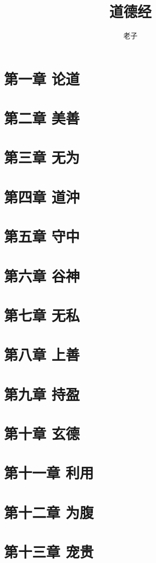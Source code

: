\documentclass[UTF8]{ctexbook}
\title{道德经}
\author{老子}
\date{}
\begin{document}
	\maketitle

	\tableofcontents
	
	\section{第一章 论道}
	\section{第二章 美善}
	\section{第三章 无为}
	\section{第四章 道沖}
	\section{第五章 守中}
	\section{第六章 谷神}
	\section{第七章 无私}
	\section{第八章 上善}
	\section{第九章 持盈}
	\section{第十章 玄德}
	\section{第十一章 利用}
	\section{第十二章 为腹}
	\section{第十三章 宠贵}
\end{document}
